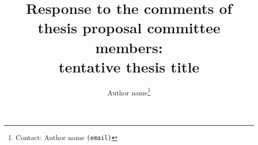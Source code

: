 
\allowdisplaybreaks[1]
\setcounter{MaxMatrixCols}{20}          %
\newcommand{\dC}{$^{\circ}$C}           %
\newcommand{\vect}[1]{\mathbf{#1}}      %
\DeclareMathOperator{\tr}{tr}           %
\DeclareMathOperator{\divg}{div}        %
\DeclareMathOperator{\grad}{grad}       %





\newcommand{\question}{\textcolor{RoyalBlue}}

\newcommand{\COMMENT}{\textcolor{red}}
\newcommand{\ADDCITATION}{\COMMENT{(ADD CITATION)}}

\newcommand{\say}[2]{\hfill\small\enquote{\textit{#1}}{ - \small\textsc{#2}.}}












\title{\vspace{-0.75in}\large{Response to the comments of thesis proposal committee members: \\
tentative thesis title}}
\author[]{Author name\footnote{Contact: Author name \texttt{(email)}}} 
\date{}

